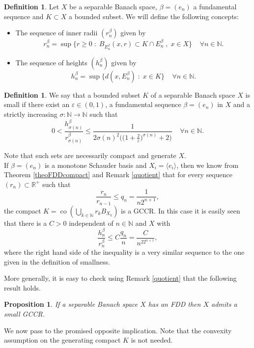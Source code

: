 \documentclass[11pt]{amsart}
\newcommand{\ep}{\varepsilon}
\newcommand{\N}{\mathbb{N}}
\newcommand{\R}{\mathbb{R}}
\DeclareMathOperator{\co}{co}
\newcommand{\<}{\langle}
\renewcommand{\>}{\rangle}
\newtheorem{prop}[theorem]{Proposition}
\theoremstyle{definition}
\newtheorem{definition}[theorem]{Definition}
\theoremstyle{remark}
\numberwithin{equation}{section}
\def\R{{\mathbb R}}
\begin{document}
\begin{definition}
Let $X$ be a separable Banach space, $\beta=(e_n)$ a fundamental sequence and $K\subset X$ a bounded subset. We will define the following concepts:
\begin{itemize}
\item The sequence of inner radii $(r_n^\beta)$ given by
$$r_n^\beta=\sup\big\{r\ge0\;:\;B_{E_n^\beta}(x,r)\subset K\cap E_n^{\beta}\;,\;x\in X\big\}\;\;\;\;\forall n\in\N.$$
\item The sequence of heights $(h_n^\beta)$ given by
$$h_n^\beta=\sup\big\{d(x,E_n^\beta)\;:\;x\in K\big\}\;\;\;\;\forall n\in\N.$$
\end{itemize}
\end{definition}

\begin{definition}\label{smallcompact}
We say that a bounded subset $K$ of a separable Banach space $X$ is small if there exist an $\ep\in(0,1)$, a fundamental sequence $\beta=(e_n)$ in $X$ and a strictly increasing $\sigma:\N\rightarrow \N$ such that
$$0<\frac{h_{\sigma(n)}^\beta}{r_{\sigma(n)}^\beta}\le\frac{1}{2\sigma(n)^2\Big(\big(1+\frac{2}{\ep}\big)^{\sigma(n)}+2\Big)}\;\;\;\;\forall n\in\N.$$
\end{definition}

Note that such sets are necessarily compact and generate $X$.\\

If $\beta=(e_n)$ is a monotone Schauder basis and $X_i=\langle e_i\rangle$, then we know from Theorem \ref{theoFDDcompact} and Remark \ref{quotient} that for every sequence $(r_n)\subset\R^+$ such that
$$\frac{r_n}{r_{n-1}}\le q_n=\frac{1}{n2^{n+1}},$$
the compact $K=\co\left(\bigcup\limits_{k\in\N}r_kB_{X_k}\right)$ is a GCCR. In this case it is easily seen that there is a $C>0$ independent of $n\in\N$ and $X$ with
$$\frac{h_{n}^\beta}{r_{n}^\beta}\le C\frac{q_n}{n}=\frac{C}{n^22^{n+1}},$$
where the right hand side of the inequality is a very similar sequence to the one given in the definition of smallness.

More generally, it is easy to check using Remark \ref{quotient} that the following result holds.

\begin{prop}
If a separable Banach space  $X$ has an FDD then $X$ admits a small GCCR.
\end{prop}

We now pass to the promised opposite implication. Note that the convexity assumption on the generating compact $K$ is not needed.
\end{document}
